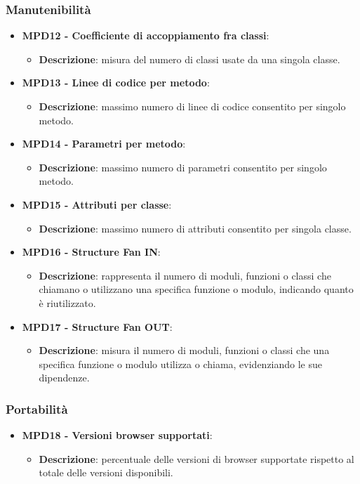 \documentclass[10pt]{article}
\begin{document}
\begin{justify}
\subsubsection{Manutenibilità}
\begin{itemize}
    \item \textbf{MPD12 - Coefficiente di accoppiamento fra classi}:
    \begin{itemize}
        \item \textbf{Descrizione}: misura del numero di classi usate da una singola classe.
    \end{itemize}
    \item \textbf{MPD13 - Linee di codice per metodo}:
      \begin{itemize}
        \item \textbf{Descrizione}: massimo numero di linee di codice consentito per singolo metodo.
      \end{itemize}
    \item \textbf{MPD14 - Parametri per metodo}:
      \begin{itemize}
        \item \textbf{Descrizione}: massimo numero di parametri consentito per singolo metodo.
      \end{itemize}
    \item \textbf{MPD15 - Attributi per classe}:
      \begin{itemize}
        \item \textbf{Descrizione}: massimo numero di attributi consentito per singola classe.
      \end{itemize}
    \item \textbf{MPD16 - Structure Fan IN}:
      \begin{itemize}
        \item \textbf{Descrizione}: rappresenta il numero di moduli, funzioni o classi che chiamano o utilizzano una specifica funzione o modulo, indicando quanto è riutilizzato.
      \end{itemize}
    \item \textbf{MPD17 - Structure Fan OUT}:
      \begin{itemize}
        \item \textbf{Descrizione}: misura il numero di moduli, funzioni o classi che una specifica funzione o modulo utilizza o chiama, evidenziando le sue dipendenze.
      \end{itemize}
\end{itemize}

\subsubsection{Portabilità}
  \begin{itemize}
    \item \textbf{MPD18 - Versioni browser supportati}:
      \begin{itemize}
        \item \textbf{Descrizione}: percentuale delle versioni di browser supportate rispetto al totale delle versioni disponibili.
      \end{itemize}
\end{itemize}


\end{justify}
\end{document}
